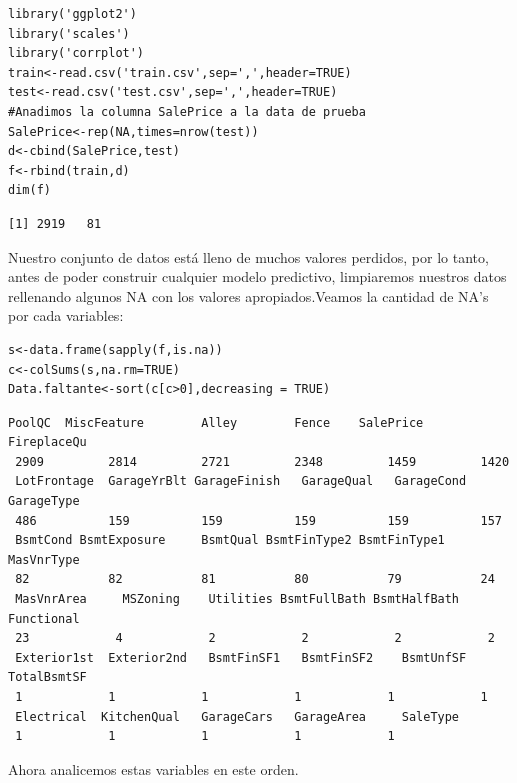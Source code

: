 \documentclass{report}
\begin{document}
\begin{itemize}
\begin{itemize}
\lstset{language=R, breaklines=true, basicstyle=\footnotesize}
\begin{lstlisting}[frame=single]
library('ggplot2')
library('scales')
library('corrplot')
train<-read.csv('train.csv',sep=',',header=TRUE)
test<-read.csv('test.csv',sep=',',header=TRUE)
#Anadimos la columna SalePrice a la data de prueba
SalePrice<-rep(NA,times=nrow(test))
d<-cbind(SalePrice,test)
f<-rbind(train,d)   
dim(f)
\end{lstlisting}  

\begin{lstlisting}[frame=single]
[1] 2919   81
\end{lstlisting} 
\vspace{2mm}

Nuestro conjunto de datos está lleno de muchos valores perdidos, por lo tanto, antes de poder construir cualquier modelo predictivo, limpiaremos nuestros datos rellenando algunos NA con los valores apropiados.Veamos la cantidad de NA's por cada variables: \\

\begin{lstlisting}[frame=single]
s<-data.frame(sapply(f,is.na))
c<-colSums(s,na.rm=TRUE)
Data.faltante<-sort(c[c>0],decreasing = TRUE)
\end{lstlisting}

\newpage
\begin{lstlisting}[frame=single]
 PoolQC  MiscFeature        Alley        Fence    SalePrice  FireplaceQu 
 2909         2814         2721         2348         1459         1420 
 LotFrontage  GarageYrBlt GarageFinish   GarageQual   GarageCond   GarageType 
 486          159          159          159          159          157 
 BsmtCond BsmtExposure     BsmtQual BsmtFinType2 BsmtFinType1   MasVnrType 
 82           82           81           80           79           24 
 MasVnrArea     MSZoning    Utilities BsmtFullBath BsmtHalfBath   Functional 
 23            4            2            2            2            2 
 Exterior1st  Exterior2nd   BsmtFinSF1   BsmtFinSF2    BsmtUnfSF  TotalBsmtSF 
 1            1            1            1            1            1 
 Electrical  KitchenQual   GarageCars   GarageArea     SaleType 
 1            1            1            1            1 
\end{lstlisting}
\vspace{2mm}

Ahora analicemos estas variables en este orden.\\


\end{itemize}
\end{itemize}
\end{document}
